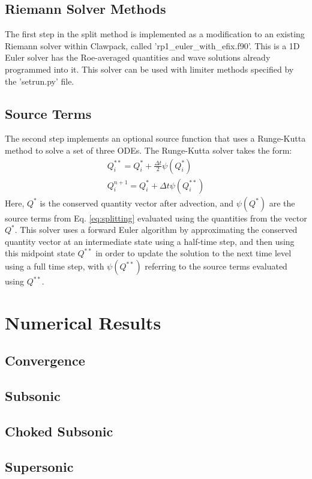 \documentclass{article}%
\numberwithin{equation}{section}
\begin{document}
\subsection{Riemann Solver Methods}
The first step in the split method is implemented as a modification to an existing Riemann solver within Clawpack, called 'rp1\_euler\_with\_efix.f90'. This is a 1D Euler solver has the Roe-averaged quantities and wave solutions already programmed into it. This solver can be used with limiter methods specified by the 'setrun.py' file. 
\subsection{Source Terms}
The second step implements an optional source function that uses a Runge-Kutta method to solve a set of three ODEs. The Runge-Kutta solver takes the form:
\begin{equation}
\begin{split}
Q^{**}_i=Q^*_i+\frac{\Delta t}{2} \psi (Q^*_i) \\
Q^{n+1}_i=Q^*_i+ \Delta t \psi(Q^{**}_i)
\end{split}
\end{equation}
Here, $ Q^* $ is the conserved quantity vector after advection, and $ \psi(Q^*) $ are the source terms from Eq. \ref{eq:splitting} evaluated using the quantities from the vector $ Q^* $. This solver uses a forward Euler algorithm by approximating the conserved quantity vector at an intermediate state using a half-time step, and then using this midpoint state $ Q^{**} $ in order to update the solution to the next time level using a full time step, with $ \psi(Q^{**}) $ referring to the source terms evaluated using $ Q^{**} $.

\section{Numerical Results}

\subsection{Convergence}

\subsection{Subsonic}

\subsection{Choked Subsonic}

\subsection{Supersonic}
\end{document}
